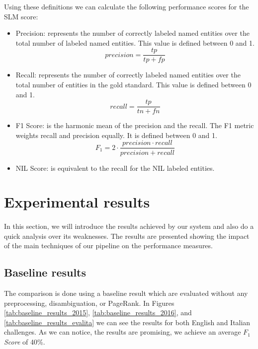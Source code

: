Using these definitions we can calculate the following performance scores for the SLM score:
\begin{itemize}[itemsep = 0.1em]
\item Precision: represents the number of correctly labeled named entities over the total number of labeled named entities. This value is defined between 0 and 1.
\begin{equation}
precision = \frac{tp}{tp+fp}
\end{equation}

\item Recall: represents the number of correctly labeled named entities over the total number of entities in the gold standard. This value is defined between 0 and 1.
\begin{equation}
recall = \frac{tp}{tn+fn}
\end{equation}
\item F1 Score: is the harmonic mean of the precision and the recall. The F1 metric weights recall and precision equally. It is defined between 0 and 1. 
\begin{equation}
F_1 = 2 \cdot \frac{precision \cdot recall}{precision+recall}
\end{equation}
\item NIL Score: is equivalent to the recall for the NIL labeled entities.
\end{itemize}	


\section{Experimental results}
\paragraph{} In this section, we will introduce the results achieved by our system and also do a quick analysis over its weaknesses. The results are presented showing the impact of the main techniques of our pipeline on the performance measures. 


\subsection{Baseline results}
The comparison is done using a baseline result which are evaluated without any preprocessing, disambiguation, or PageRank. In Figures \ref{tab:baseline_results_2015}, \ref{tab:baseline_results_2016}, and \ref{tab:baseline_results_evalita} we can see the results for both English and Italian challenges. As we can notice, the results are promising, we achieve an average \(F_1\) \textit{Score} of 40\%. 

